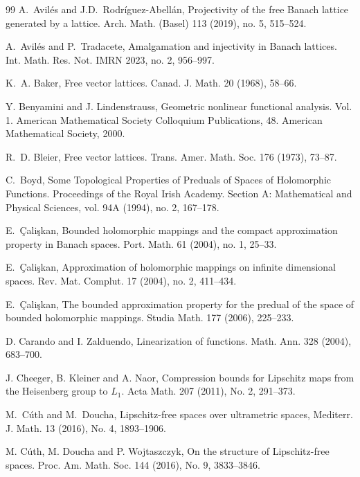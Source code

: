 \documentclass[12pt,leqno]{amsart}
\numberwithin{equation}{section} %
\theoremstyle{definition}
\numberwithin{equation}{section}
\begin{document}
\begin{thebibliography}{99}
  A.~Avil\'es and J.D.~Rodr\'iguez-Abell\'an, Projectivity of the free Banach lattice generated by a lattice. Arch. Math. (Basel) 113 (2019), no. 5, 515--524.
   
 A.~Avil\'es and P.~Tradacete,
Amalgamation and injectivity in Banach lattices. Int. Math. Res. Not. IMRN 2023, no. 2, 956--997.


 K.~A. Baker, Free vector lattices. Canad. J. Math. 20 (1968),
   58--66. %

Y. Benyamini and J. Lindenstrauss, Geometric nonlinear functional analysis. Vol. 1. American Mathematical Society Colloquium Publications, 48. American Mathematical Society, 2000.

 R.~D. Bleier, Free vector lattices. Trans. Amer. Math. Soc. 176
   (1973), 73--87. %

 C.~Boyd, Some Topological Properties of Preduals of Spaces of Holomorphic Functions.  Proceedings of the Royal Irish Academy. Section A: Mathematical and Physical Sciences, vol. 94A (1994), no. 2, 167--178.

   E.~\c{C}ali\c{s}kan, Bounded holomorphic mappings and the compact approximation property in Banach spaces. Port. Math. 61 (2004), no. 1, 25--33.

   E.~\c{C}ali\c{s}kan, Approximation of holomorphic mappings on infinite dimensional spaces. Rev. Mat. Complut. 17 (2004), no. 2, 411--434.

   E.~\c{C}ali\c{s}kan, The bounded approximation property for the predual of the space of bounded holomorphic mappings. Studia Math. 177 (2006), 225--233.
   
 D. Carando and I. Zalduendo, Linearization of functions. Math. Ann. 328 (2004), 683--700.

J. Cheeger, B. Kleiner and A. Naor, Compression bounds for Lipschitz maps from the Heisenberg group to $L_1$. Acta Math. 207 (2011), No. 2, 291--373. 

 M.~C\'uth and M.~Doucha, Lipschitz-free spaces over ultrametric spaces, Mediterr. J. Math. 13 (2016), No. 4, 1893--1906.

 M. C\'uth, M. Doucha and P. Wojtaszczyk, On the structure of Lipschitz-free spaces. Proc. Am. Math. Soc. 144 (2016), No. 9, 3833--3846. 


\end{thebibliography}
\end{document}
